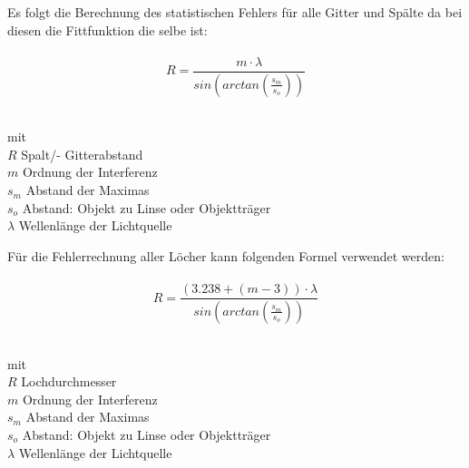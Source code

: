 Es folgt die Berechnung des statistischen Fehlers für alle Gitter und Spälte da bei diesen die Fittfunktion die selbe ist:\\
\\
\begin{equation}
R = \frac{m \cdot \lambda}{sin \left(arctan \left(\frac{s_m}{s_o}\right)\right)}
\label{eq:fitt_loch}
\end{equation}
\begin{tabbing}
\hspace{40mm}			\=   			\\
mit	\>						\\
$R$	\> Spalt/- Gitterabstand			\\
$m$ 	\> Ordnung der Interferenz			\\
$s_m$	\> Abstand der Maximas				\\
$s_o$	\> Abstand: Objekt zu Linse oder Objektträger 	\\
$\lambda$	\> Wellenlänge der Lichtquelle 	\\
\end{tabbing}

Für die Fehlerrechnung aller Löcher kann folgenden Formel verwendet werden:\\
\\
\begin{equation}
R = \frac{\left( 3.238 + \left(m-3 \right) \right) \cdot \lambda}{sin \left(arctan \left(\frac{s_m}{s_o}\right)\right)}
\label{eq:fitt_loch}
\end{equation}
\begin{tabbing}
\hspace{40mm}			\=   			\\
mit	\>						\\
$R$	\> Lochdurchmesser					\\
$m$ 	\> Ordnung der Interferenz			\\
$s_m$	\> Abstand der Maximas				\\
$s_o$	\> Abstand: Objekt zu Linse oder Objektträger 	\\
$\lambda$	\> Wellenlänge der Lichtquelle 	\\
\end{tabbing}



